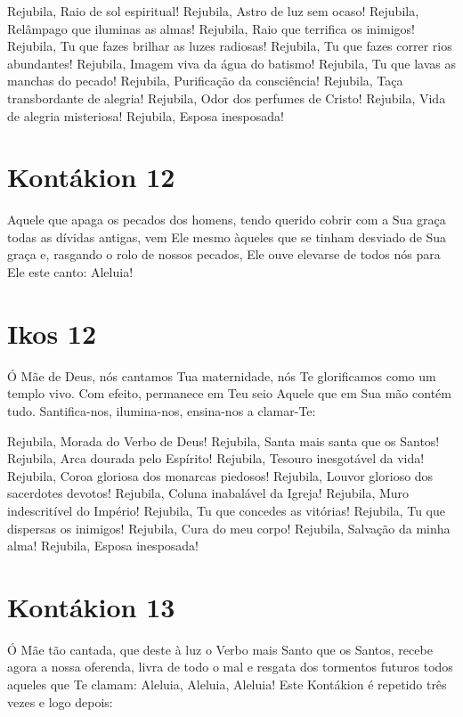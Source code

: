 \documentclass{subfiles}
\begin{document}
Rejubila, Raio de sol espiritual!
Rejubila, Astro de luz sem ocaso!
Rejubila, Relâmpago que iluminas as almas!
Rejubila, Raio que terrifica os inimigos!
Rejubila, Tu que fazes brilhar as luzes radiosas!
Rejubila, Tu que fazes correr rios abundantes!
Rejubila, Imagem viva da água do batismo!
Rejubila, Tu que lavas as manchas do pecado!
Rejubila, Purificação da consciência!
Rejubila, Taça transbordante de alegria!
Rejubila, Odor dos perfumes de Cristo!
Rejubila, Vida de alegria misteriosa!
Rejubila, Esposa inesposada!

\section*{Kontákion 12}

Aquele que apaga os pecados dos homens, tendo querido cobrir com a Sua graça
todas as dívidas antigas, vem Ele mesmo àqueles que se tinham desviado de Sua
graça e, rasgando o rolo de nossos pecados, Ele ouve elevarse de todos nós para
Ele este canto: Aleluia!

\section*{Ikos 12}

Ó Mãe de Deus, nós cantamos Tua maternidade, nós Te glorificamos
como um templo vivo. Com efeito, permanece em Teu seio Aquele que em Sua
mão contém tudo. Santifica-nos, ilumina-nos, ensina-nos a clamar-Te:

Rejubila, Morada do Verbo de Deus!
Rejubila, Santa mais santa que os Santos!
Rejubila, Arca dourada pelo Espírito!
Rejubila, Tesouro inesgotável da vida!
Rejubila, Coroa gloriosa dos monarcas piedosos!
Rejubila, Louvor glorioso dos sacerdotes devotos!
Rejubila, Coluna inabalável da Igreja!
Rejubila, Muro indescritível do Império!
Rejubila, Tu que concedes as vitórias!
Rejubila, Tu que dispersas os inimigos!
Rejubila, Cura do meu corpo!
Rejubila, Salvação da minha alma!
Rejubila, Esposa inesposada!

\section*{Kontákion 13}

Ó Mãe tão cantada, que deste à luz o Verbo mais Santo que os Santos,
recebe agora a nossa oferenda, livra de todo o mal e resgata dos tormentos
futuros todos aqueles que Te clamam: Aleluia, Aleluia, Aleluia! Este Kontákion
é repetido três vezes e logo depois:
\end{document}
